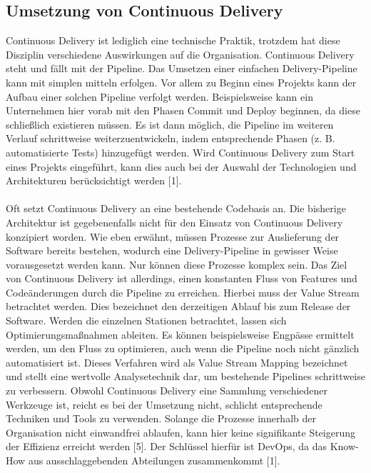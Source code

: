 \subsection{Umsetzung von Continuous Delivery}
Continuous Delivery ist lediglich eine technische Praktik, trotzdem hat diese Disziplin verschiedene Auswirkungen auf die Organisation. Continuous Delivery steht und fällt mit der Pipeline. Das Umsetzen einer einfachen Delivery-Pipeline kann mit simplen mitteln erfolgen. Vor allem zu Beginn eines Projekts kann der Aufbau einer solchen Pipeline verfolgt werden. Beispielsweise kann ein Unternehmen hier vorab mit den Phasen Commit und Deploy beginnen, da diese schließlich existieren müssen. Es ist dann möglich, die Pipeline im weiteren Verlauf schrittweise weiterzuentwickeln, indem entsprechende Phasen (z. B. automatisierte Tests) hinzugefügt werden. Wird Continuous Delivery zum Start eines Projekts eingeführt, kann dies auch bei der Auswahl der Technologien und Architekturen berücksichtigt werden [1]. \\ \\
Oft setzt Continuous Delivery an eine bestehende Codebasis an. Die bisherige Architektur ist gegebenenfalls nicht für den Einsatz von Continuous Delivery konzipiert worden. Wie eben erwähnt, müssen Prozesse zur Auslieferung der Software bereits bestehen, wodurch eine Delivery-Pipeline in gewisser Weise vorausgesetzt werden kann. Nur können diese Prozesse komplex sein. Das Ziel von Continuous Delivery ist allerdings, einen konstanten Fluss von Features und Codeänderungen durch die Pipeline zu erreichen. Hierbei muss der Value Stream betrachtet werden. Dies bezeichnet den derzeitigen Ablauf bis zum Release der Software. Werden die einzelnen Stationen betrachtet, lassen sich Optimierungsmaßnahmen ableiten. Es können beispielsweise Engpässe ermittelt werden, um den Fluss zu optimieren, auch wenn die Pipeline noch nicht gänzlich automatisiert ist. Dieses Verfahren wird als Value Stream Mapping bezeichnet und stellt eine wertvolle Analysetechnik dar, um bestehende Pipelines schrittweise zu verbessern. Obwohl Continuous Delivery eine Sammlung verschiedener Werkzeuge ist, reicht es bei der Umsetzung nicht, schlicht entsprechende Techniken und Tools zu verwenden. Solange die Prozesse innerhalb der Organisation nicht einwandfrei ablaufen, kann hier keine signifikante Steigerung der Effizienz erreicht werden [5]. Der Schlüssel hierfür ist DevOps, da das Know-How aus ausschlaggebenden Abteilungen zusammenkommt [1].

